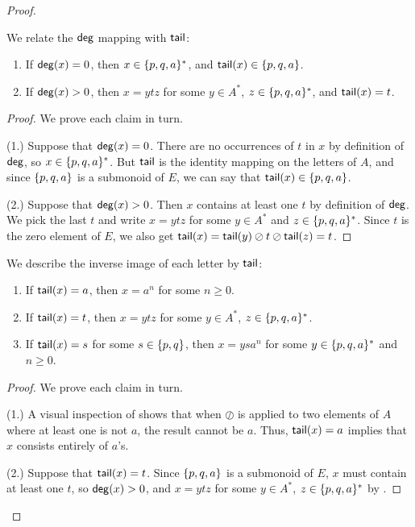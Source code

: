 \documentclass[../generics]{subfiles}
\begin{document}
\begin{proof}
\begin{lemma}\label{lemma:tpqa deg}
We relate the $\mathsf{deg}$ mapping with $\mathsf{tail}$:
\begin{enumerate}
\item If $\mathsf{deg}(x)=0$, then $x \in \{p,q,a\}^*$, and $\mathsf{tail}(x) \in \{p,q,a\}$.
\item If $\mathsf{deg}(x)>0$, then $x = ytz$ for some $y \in A^*$, $z \in \{p,q,a\}^*$, and $\mathsf{tail}(x)=t$.
\end{enumerate}
\end{lemma}
\begin{proof}
We prove each claim in turn.

\smallskip

(1.) Suppose that $\mathsf{deg}(x)=0$. There are no occurrences of $t$ in $x$ by definition of $\mathsf{deg}$, so $x \in \{p,q,a\}^*$. But $\mathsf{tail}$ is the identity mapping on the letters of $A$, and since $\{p,q,a\}$ is a submonoid of $E$, we can say that $\mathsf{tail}(x) \in \{p,q,a\}$.

\smallskip

(2.) Suppose that $\mathsf{deg}(x)>0$. Then $x$ contains at least one $t$ by definition of $\mathsf{deg}$. We pick the last $t$ and write $x=ytz$ for some $y \in A^*$ and $z \in \{p,q,a\}^*$. Since $t$ is the zero element of $E$, we also get $\mathsf{tail}(x)=\mathsf{tail}(y) \oslash t \oslash \mathsf{tail}(z) = t$.
\end{proof}

\begin{lemma}\label{lemma:tpqa tail}
We describe the inverse image of each letter by $\mathsf{tail}$:
\begin{enumerate}
\item If $\mathsf{tail}(x)=a$, then $x = a^n$ for some $n \geq 0$.
\item If $\mathsf{tail}(x)=t$, then $x = ytz$ for some $y \in A^*$, $z \in \{p,q,a\}^*$.
\item If $\mathsf{tail}(x)=s$ for some $s \in \{p,q\}$, then $x=ysa^n$ for some $y \in \{p,q,a\}^*$ and $n \geq 0$.
\end{enumerate}
\end{lemma}
\begin{proof}
We prove each claim in turn.

(1.) A visual inspection of  shows that when $\oslash$ is applied to two elements of $A$ where at least one is not $a$, the result cannot be $a$. Thus, $\mathsf{tail}(x)=a$ implies that $x$ consists entirely of $a$'s.

\smallskip

(2.) Suppose that $\mathsf{tail}(x)=t$. Since $\{p,q,a\}$ is a submonoid of $E$, $x$ must contain at least one $t$, so $\mathsf{deg}(x) > 0$, and $x=ytz$ for some $y \in A^*$, $z \in \{p,q,a\}^*$ by .


\end{proof}
\end{proof}
\end{document}
